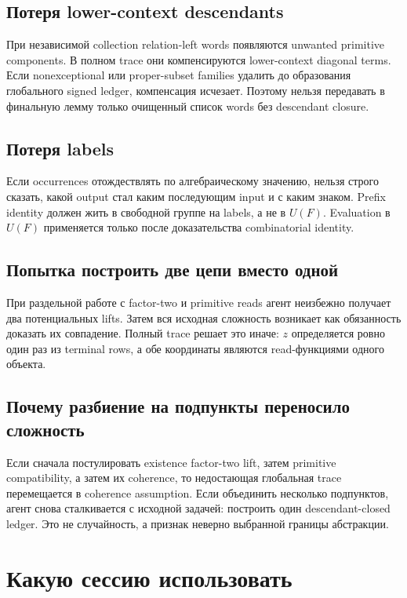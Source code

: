 \documentclass[11pt,a4paper]{article}
\theoremstyle{definition}
\theoremstyle{remark}
\begin{document}
\subsection{Потеря lower-context descendants}

При независимой collection relation-left words появляются unwanted primitive
components. В полном trace они компенсируются lower-context diagonal terms.
Если nonexceptional или proper-subset families удалить до образования
глобального signed ledger, компенсация исчезает. Поэтому нельзя передавать в
финальную лемму только очищенный список words без descendant closure.

\subsection{Потеря labels}

Если occurrences отождествлять по алгебраическому значению, нельзя строго
сказать, какой output стал каким последующим input и с каким знаком. Prefix
identity должен жить в свободной группе на labels, а не в $U(F)$. Evaluation
в $U(F)$ применяется только после доказательства combinatorial identity.

\subsection{Попытка построить две цепи вместо одной}

При раздельной работе с factor-two и primitive reads агент неизбежно получает
два потенциальных lifts. Затем вся исходная сложность возникает как
обязанность доказать их совпадение. Полный trace решает это иначе: $z$
определяется ровно один раз из terminal rows, а обе координаты являются
read-функциями одного объекта.

\subsection{Почему разбиение на подпункты переносило сложность}

Если сначала постулировать existence factor-two lift, затем primitive
compatibility, а затем их coherence, то недостающая глобальная trace
перемещается в coherence assumption. Если объединить несколько подпунктов,
агент снова сталкивается с исходной задачей: построить один descendant-closed
ledger. Это не случайность, а признак неверно выбранной границы абстракции.

\section{Какую сессию использовать}
\end{document}
